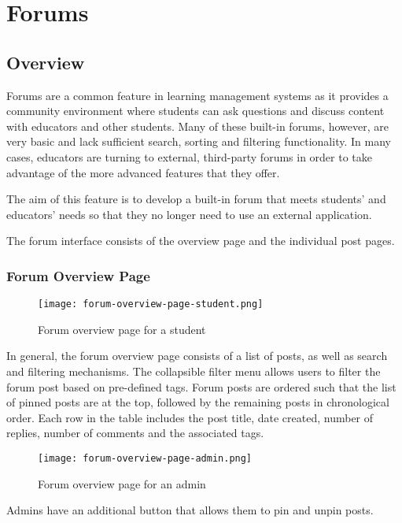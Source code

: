 \section{Forums}
\subsection{Overview}
Forums are a common feature in learning management systems as it provides a community environment where students can ask questions and discuss content with educators and other students.
Many of these built-in forums, however, are very basic and lack sufficient search, sorting and filtering functionality.
In many cases, educators are turning to external, third-party forums in order to take advantage of the more advanced features that they offer.

The aim of this feature is to develop a built-in forum that meets students' and educators' needs so that they no longer need to use an external application.

The forum interface consists of the overview page and the individual post pages.

\newpage

\subsubsection{Forum Overview Page}

\begin{figure}[h!]
    \texttt{[image: forum-overview-page-student.png]}
    \centering
    \caption{Forum overview page for a student}
\end{figure}

In general, the forum overview page consists of a list of posts, as well as search and filtering mechanisms.
The collapsible filter menu allows users to filter the forum post based on pre-defined tags.
Forum posts are ordered such that the list of pinned posts are at the top, followed by the remaining posts in chronological order.
Each row in the table includes the post title, date created, number of replies, number of comments and the associated tags.

\begin{figure}[h!]
    \texttt{[image: forum-overview-page-admin.png]}
    \centering
    \caption{Forum overview page for an admin}
\end{figure}

Admins have an additional button that allows them to pin and unpin posts.

